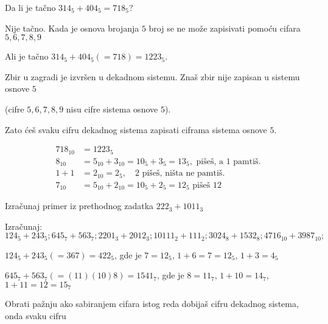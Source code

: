    

    Da li je ta\v cno $314_5 + 404_5 = 718_5$?



    Nije ta\v cno. Kada je osnova brojanja $5$ broj se ne mo\v ze zapisivati pomo\' cu cifara $5, 6, 7, 8, 9$

    

    Ali je ta\v cno $314_5 + 404_5 (=718) = 1223_5$.



    Zbir u zagradi je izvr\v sen u dekadnom sistemu. Zna\v s zbir nije zapisan u sistemu osnove $5$

    (cifre $5, 6, 7, 8, 9$ nisu cifre sistema osnove $5$).



    Zato \' ce\v s svaku cifru dekadnog sistema zapisati ciframa sistema osnove $5$.

    \begin{align*}

        718_{10} &= 1223_5 \\

        8_{10} &= 5_{10} + 3_{10} = 10_{5} + 3_{5} = 13_{5}, \text{ pi\v se\v s, a } 1 \text{ pamti\v s}. \\

        1 + 1 &= 2_{10} = 2_5, \quad 2 \text{ pi\v se\v s, ni\v sta ne pamti\v s}. \\

        7_{10} &= 5_{10} + 2_{10} = 10_5 + 2_5 = 12_5 \text{ pi\v se\v s } 12

    \end{align*}

    Izra\v cunaj primer iz prethodnog zadatka $222_3 + 1011_3$

    \begin{zad}

        Izra\v cunaj: $124_5 + 243_5; 645_7 + 563_7; 2201_3 + 2012_3; 10111_2 + 111_2; 3024_8 + 1532_8; 4716_{10} + 3987_{10};$

    \end{zad}

    $124_5 + 243_5 (= 367) = 422_5$, gde je $7 = 12_5$, $1 + 6 = 7 = 12_5$, $1 + 3 = 4_5$

    $645_7 + 563_7 (= (11)(10)8) = 1541_7$, gde je $8 = 11_7$, $1 + 10 = 14_7$, $1 + 11 = 12 = 15_7$



    Obrati pa\v znju ako sabiranjem cifara istog reda dobija\v s cifru dekadnog sistema, onda svaku cifru

